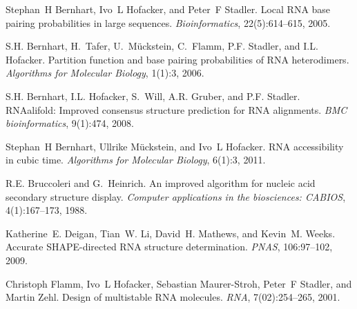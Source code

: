
\begin{DoxyDescription}
\item[\label{citelist_CITEREF_bernhart:2005}%
\Hypertarget{citelist_CITEREF_bernhart:2005}%
\mbox{[}1\mbox{]}]Stephan~H Bernhart, Ivo~L Hofacker, and Peter~F Stadler. Local RNA base pairing probabilities in large sequences. {\itshape Bioinformatics}, 22(5)\+:614--615, 2005.


\item[\label{citelist_CITEREF_bernhart:2006}%
\Hypertarget{citelist_CITEREF_bernhart:2006}%
\mbox{[}2\mbox{]}]S.\+H. Bernhart, H.~Tafer, U.~M\"{u}ckstein, C.~Flamm, P.\+F. Stadler, and I.\+L. Hofacker. Partition function and base pairing probabilities of RNA heterodimers. {\itshape Algorithms for Molecular Biology}, 1(1)\+:3, 2006.


\item[\label{citelist_CITEREF_bernhart:2008}%
\Hypertarget{citelist_CITEREF_bernhart:2008}%
\mbox{[}3\mbox{]}]S.\+H. Bernhart, I.\+L. Hofacker, S.~Will, A.\+R. Gruber, and P.\+F. Stadler. RNAalifold\+: Improved consensus structure prediction for RNA alignments. {\itshape BMC bioinformatics}, 9(1)\+:474, 2008.


\item[\label{citelist_CITEREF_bernhart:2011}%
\Hypertarget{citelist_CITEREF_bernhart:2011}%
\mbox{[}4\mbox{]}]Stephan~H Bernhart, Ullrike M\"{u}ckstein, and Ivo~L Hofacker. RNA accessibility in cubic time. {\itshape Algorithms for Molecular Biology}, 6(1)\+:3, 2011.


\item[\label{citelist_CITEREF_bruccoleri:1988}%
\Hypertarget{citelist_CITEREF_bruccoleri:1988}%
\mbox{[}5\mbox{]}]R.\+E. Bruccoleri and G.~Heinrich. An improved algorithm for nucleic acid secondary structure display. {\itshape Computer applications in the biosciences\+: CABIOS}, 4(1)\+:167--173, 1988.


\item[\label{citelist_CITEREF_deigan:2009}%
\Hypertarget{citelist_CITEREF_deigan:2009}%
\mbox{[}6\mbox{]}]Katherine~E. Deigan, Tian~W. Li, David~H. Mathews, and Kevin~M. Weeks. Accurate SHAPE-\/directed RNA structure determination. {\itshape PNAS}, 106\+:97--102, 2009.


\item[\label{citelist_CITEREF_flamm:2001}%
\Hypertarget{citelist_CITEREF_flamm:2001}%
\mbox{[}7\mbox{]}]Christoph Flamm, Ivo~L Hofacker, Sebastian Maurer-\/\+Stroh, Peter~F Stadler, and Martin Zehl. Design of multistable RNA molecules. {\itshape RNA}, 7(02)\+:254--265, 2001.



\end{DoxyDescription}
